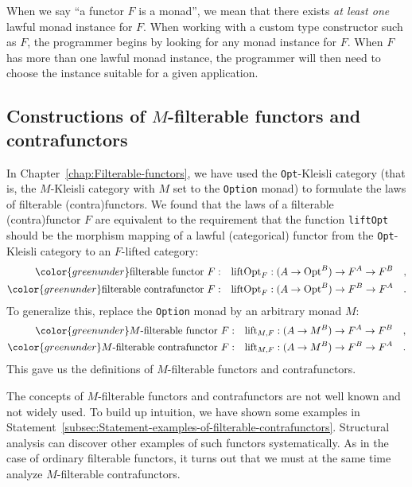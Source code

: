When we say \textsf{``}a functor $F$ is a monad\textsf{''}, we mean that there exists\emph{
at least one} lawful monad instance for $F$. When working with a
custom type constructor such as $F$, the programmer begins by looking
for any monad instance for $F$. When $F$ has more than one lawful
monad instance, the programmer will then need to choose the instance
suitable for a given application.

\subsection{Constructions of $M$-filterable functors and contrafunctors\label{subsec:Constructions-of-M-filterables}}

In Chapter~\ref{chap:Filterable-functors}, we have used the \lstinline!Opt!-Kleisli
category (that is, the $M$-Kleisli category with $M$ set to the
\lstinline!Option! monad) to formulate the laws of filterable (contra)functors.
We found that the laws of a filterable (contra)functor $F$ are equivalent
to the requirement that the function \lstinline!liftOpt! should be
the morphism mapping of a lawful (categorical) functor from the \lstinline!Opt!-Kleisli
category to an $F$-lifted category:
\begin{align*}
{\color{greenunder}\text{filterable functor }F:}\quad & \text{liftOpt}_{F}:(A\rightarrow\text{Opt}^{B})\rightarrow F^{A}\rightarrow F^{B}\quad,\\
{\color{greenunder}\text{filterable contrafunctor }F:}\quad & \text{liftOpt}_{F}:(A\rightarrow\text{Opt}^{B})\rightarrow F^{B}\rightarrow F^{A}\quad.
\end{align*}
To generalize this, replace the \lstinline!Option! monad by an arbitrary
monad $M$:
\begin{align*}
{\color{greenunder}M\text{-filterable functor }F:}\quad & \text{lift}_{M,F}:(A\rightarrow M^{B})\rightarrow F^{A}\rightarrow F^{B}\quad,\\
{\color{greenunder}M\text{-filterable contrafunctor }F:}\quad & \text{lift}_{M,F}:(A\rightarrow M^{B})\rightarrow F^{B}\rightarrow F^{A}\quad.
\end{align*}
 This gave us the definitions of $M$-filterable functors and contrafunctors.

The concepts of $M$-filterable functors and contrafunctors are not
well known and not widely used. To build up intuition, we have shown
some examples in Statement~\ref{subsec:Statement-examples-of-filterable-contrafunctors}.
Structural analysis can discover other examples of such functors systematically.
As in the case of ordinary filterable functors, it turns out that
we must at the same time analyze $M$-filterable contrafunctors.

